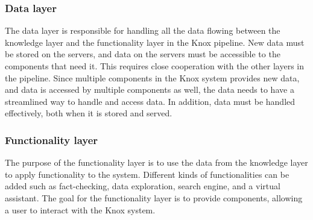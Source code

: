 \subsubsection{Data layer}\label{databaseResponsibility}
The data layer is responsible for handling all the data flowing between the knowledge layer and the functionality layer in the Knox pipeline.
New data must be stored on the servers, and data on the servers must be accessible to the components that need it. 
This requires close cooperation with the other layers in the pipeline.\newline 
Since multiple components in the Knox system provides new data, and data is accessed by multiple components as well, the data needs to have a streamlined way to handle and access data.
In addition, data must be handled effectively, both when it is stored and served.  

\subsubsection{Functionality layer}
The purpose of the functionality layer is to use the data from the knowledge layer to apply functionality to the system.
Different kinds of functionalities can be added such as fact-checking, data exploration, search engine, and a virtual assistant.
 The goal for the functionality layer is to provide components, allowing a user to interact with the Knox system. 


